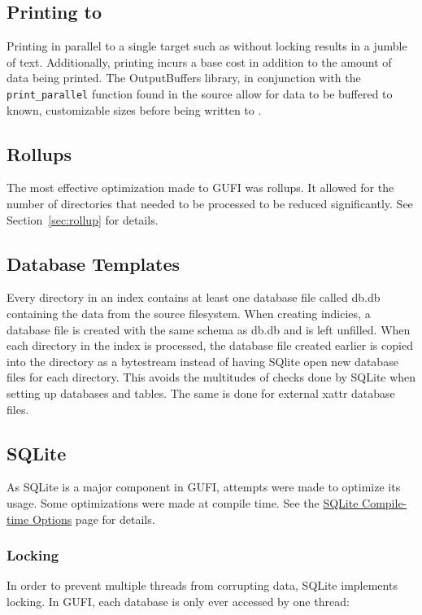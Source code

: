 \subsection{Printing to \stdout}
Printing in parallel to a single target such as \stdout
without locking results in a jumble of text. Additionally, printing
incurs a base cost in addition to the amount of data being
printed. The OutputBuffers library, in conjunction with the
\texttt{print\_parallel} function found in the \gufiquery
source allow for data to be buffered to known, customizable sizes
before being written to \stdout.

\subsection{Rollups}
The most effective optimization made to GUFI was rollups. It allowed
for the number of directories that needed to be processed to be
reduced significantly. See Section~\ref{sec:rollup} for details.

\subsection{Database Templates}
Every directory in an index contains at least one database file called
db.db containing the \lstat data from the source filesystem. When
creating indicies, a database file is created with the same schema as
db.db and is left unfilled. When each directory in the index is
processed, the database file created earlier is copied into the
directory as a bytestream instead of having SQlite open new database
files for each directory. This avoids the multitudes of checks done by
SQLite when setting up databases and tables. The same is done for
external xattr database files.

\subsection{SQLite}
As SQLite is a major component in GUFI, attempts were made to optimize
its usage. Some optimizations were made at compile time. See the
\href{https://www.sqlite.org/compile.html}{SQLite Compile-time
  Options} page for details.

\subsubsection{Locking}
In order to prevent multiple threads from corrupting data, SQLite
implements locking. In GUFI, each database is only ever accessed by
one thread:

